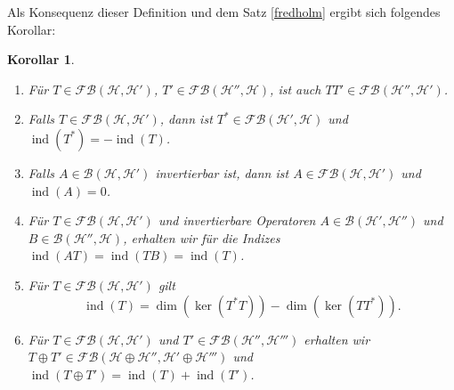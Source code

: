 \documentclass[11pt, hidelinks]{article}
\newcommand{\h}{\mathcal{H}}
\newcommand{\ind}{\operatorname{ind}}
\numberwithin{conj}{section}
\newtheorem{corollary}[conj]{Korollar}
\begin{document}
Als Konsequenz dieser Definition und dem Satz \ref{fredholm} ergibt sich folgendes Korollar:

\begin{corollary}\noindent
    \begin{enumerate}
        \item Für $T \in \mathcal{FB}(\h,\h')$, $T' \in \mathcal{FB}(\h'',\h)$, ist auch $TT'\in \mathcal{FB}(\h'',\h')$.
        \item Falls $T \in \mathcal{FB}(\h,\h')$, dann ist $T^\ast \in \mathcal{FB}(\h',\h)$ und $\ind(T^\ast) = - \ind(T)$.
        \item Falls $A \in \mathcal{B}(\h,\h')$ invertierbar ist, dann ist $A \in \mathcal{FB}(\h,\h')$ und $\ind(A) = 0$.
        \item Für $T \in \mathcal{FB}(\h,\h')$ und invertierbare Operatoren $A \in \mathcal{B}(\h',\h'')$ und $B \in \mathcal{B}(\h'',\h)$, erhalten wir für die Indizes $\ind(AT) = \ind(TB) = \ind(T)$.
        \item Für $T \in \mathcal{FB}(\h,\h')$ gilt
        \begin{equation}
            \ind(T) = \dim(\ker(T^\ast T)) - \dim(\ker(TT^\ast)).
        \end{equation}
        \item Für $T \in \mathcal{FB}(\h,\h')$ und $T' \in \mathcal{FB}(\h'',\h''')$ erhalten wir $T \oplus T' \in \mathcal{FB}(\h \oplus \h'', \h' \oplus \h''')$ und $\ind(T \oplus T') = \ind(T) + \ind(T')$. 
    \end{enumerate}
\end{corollary}
\end{document}
